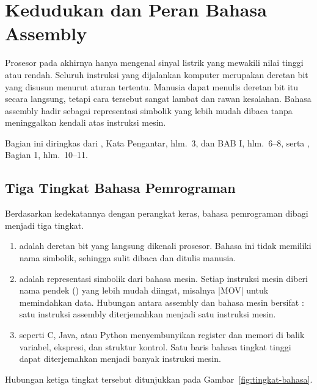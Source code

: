 \section{Kedudukan dan Peran Bahasa Assembly}
\label{sec:peran-assembly}

Prosesor pada akhirnya hanya mengenal sinyal listrik yang mewakili
nilai tinggi atau rendah. Seluruh instruksi yang dijalankan komputer
merupakan deretan bit yang disusun menurut aturan tertentu. Manusia
dapat menulis deretan bit itu secara langsung, tetapi cara tersebut
sangat lambat dan rawan kesalahan. Bahasa assembly hadir sebagai
representasi simbolik yang lebih mudah dibaca tanpa meninggalkan
kendali atas instruksi mesin.

Bagian ini diringkas dari \cite{sto2001}, Kata Pengantar, hlm.~3, dan
BAB I, hlm.~6--8, serta \cite{gunawan2019}, Bagian 1, hlm.~10--11.

\subsection{Tiga Tingkat Bahasa Pemrograman}

Berdasarkan kedekatannya dengan perangkat keras, bahasa pemrograman
dibagi menjadi tiga tingkat.

\begin{enumerate}
    \item {} adalah deretan bit yang langsung dikenali
          prosesor. Bahasa ini tidak memiliki nama simbolik, sehingga
          sulit dibaca dan ditulis manusia.

    \item {} adalah representasi simbolik dari
          bahasa mesin. Setiap instruksi mesin diberi nama pendek
          () yang lebih mudah diingat, misalnya
          \lstasm|MOV| untuk memindahkan data. Hubungan antara
          assembly dan bahasa mesin bersifat : satu
          instruksi assembly diterjemahkan menjadi satu instruksi
          mesin.

    \item {} seperti C, Java, atau Python
          menyembunyikan register dan memori di balik variabel,
          ekspresi, dan struktur kontrol. Satu baris bahasa tingkat
          tinggi dapat diterjemahkan menjadi banyak instruksi mesin.
\end{enumerate}

Hubungan ketiga tingkat tersebut ditunjukkan pada
Gambar~\ref{fig:tingkat-bahasa}.

